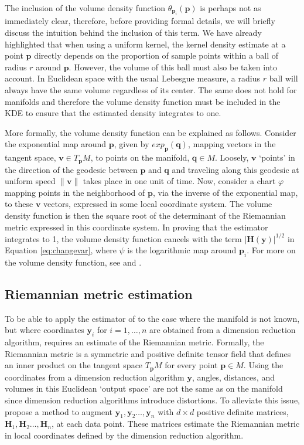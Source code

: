 \documentclass[11pt,a4paper,]{article}
\begin{document}
The inclusion of the volume density function \(\theta_{\pmb{p}_i}(\pmb{p})\) is perhaps not as immediately clear, therefore, before providing formal details, we will briefly discuss the intuition behind the inclusion of this term. We have already highlighted that when using a uniform kernel, the kernel density estimate at a point \(\pmb{p}\) directly depends on the proportion of sample points within a ball of radius \(r\) around \(\pmb{p}\). However, the volume of this ball must also be taken into account. In Euclidean space with the usual Lebesgue measure, a radius \(r\) ball will always have the same volume regardless of its center. The same does not hold for manifolds and therefore the volume density function must be included in the KDE to ensure that the estimated density integrates to one.

More formally, the volume density function can be explained as follows. Consider the exponential map around \(\pmb{p}\), given by \(exp_{\pmb{p}}(\pmb{q})\), mapping vectors in the tangent space, \(\pmb{v}\in T_{\pmb{p}}M\), to points on the manifold, \(\pmb{q}\in M\). Loosely, \(\pmb{v}\) `points' in the direction of the geodesic between \(\pmb{p}\) and \(\pmb{q}\) and traveling along this geodesic at uniform speed \(\|\pmb{v}\|\) takes place in one unit of time. Now, consider a chart \(\varphi\) mapping points in the neighborhood of \(\pmb{p}\), via the inverse of the exponential map, to these \(\pmb{v}\) vectors, expressed in some local coordinate system. The volume density function is then the square root of the determinant of the Riemannian metric expressed in this coordinate system. In proving that the estimator integrates to 1, the volume density function cancels with the term \(|\pmb{H}(\pmb{y})|^{1/2}\) in Equation \eqref{eq:changevar}, where \(\psi\) is the logarithmic map around \(\pmb{p}_i\). For more on the volume density function, see \textcite{Gallot2004-rc} and \textcite{Le_Brigant2019-lj}.

\hypertarget{MetLearn}{%
\subsection{Riemannian metric estimation}\label{MetLearn}}

To be able to apply the estimator of \textcite{Pelletier2005-vu} to the case where the manifold is not known, but where coordinates \(\pmb{y}_i\) for \(i=1,\dots,n\) are obtained from a dimension reduction algorithm, requires an estimate of the Riemannian metric. Formally, the Riemannian metric is a symmetric and positive definite tensor field that defines an inner product on the tangent space \(T_{\pmb{p}} M\) for every point \(\pmb{p} \in M\). Using the coordinates from a dimension reduction algorithm \(\pmb{y}\), angles, distances, and volumes in this Euclidean `output space' are not the same as on the manifold since dimension reduction algorithms introduce distortions. To alleviate this issue, \textcite{Perrault-Joncas2013-pq} propose a method to augment \(\pmb{y}_1,\pmb{y}_2\dots,\pmb{y}_n\) with \(d\times d\) positive definite matrices, \(\pmb{H}_1,\pmb{H}_2\dots,\pmb{H}_n\), at each data point. These matrices estimate the Riemannian metric in local coordinates defined by the dimension reduction algorithm.
\end{document}
